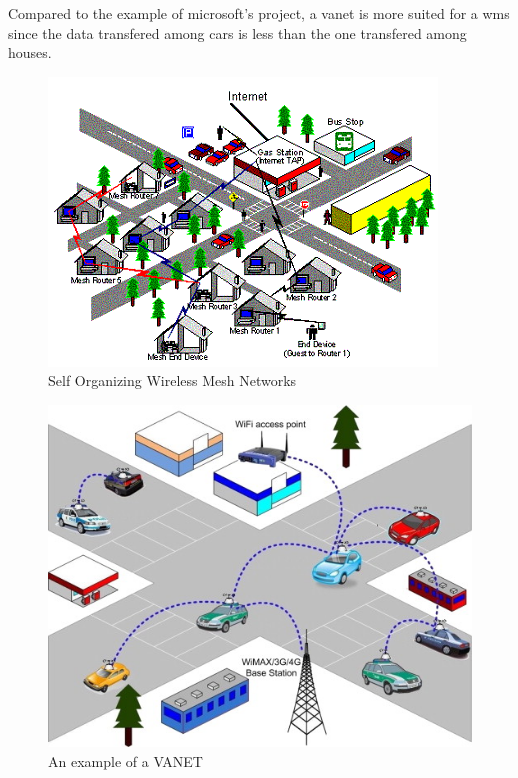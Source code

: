 		Compared to the example of microsoft's project, a vanet is more suited for a wms since the data transfered among cars is less than the one transfered among houses.
		
		\noindent
		\begin{minipage}{0.52\textwidth}%
			\begin{figure}[H]
				\centering
				\includegraphics[width=\textwidth]{resources/img/chap4/wms_microsoft}
				\caption[Self Organizing Wireless Mesh Networks]{Self Organizing Wireless Mesh Networks \cite{bahl2009opportunistic}}
				\label{img:wms_microsoft}
			\end{figure}
		\end{minipage}%
		\hfill%
		\begin{minipage}{0.48\textwidth}\raggedright
			\begin{figure}[H]
				\centering
				\includegraphics[width=\textwidth]{resources/img/chap4/vanet}
				\caption[An example of a VANET]{An example of a VANET \cite{BADIS2015653}}
				\label{img:vanet}
			\end{figure}
		\end{minipage}
	
